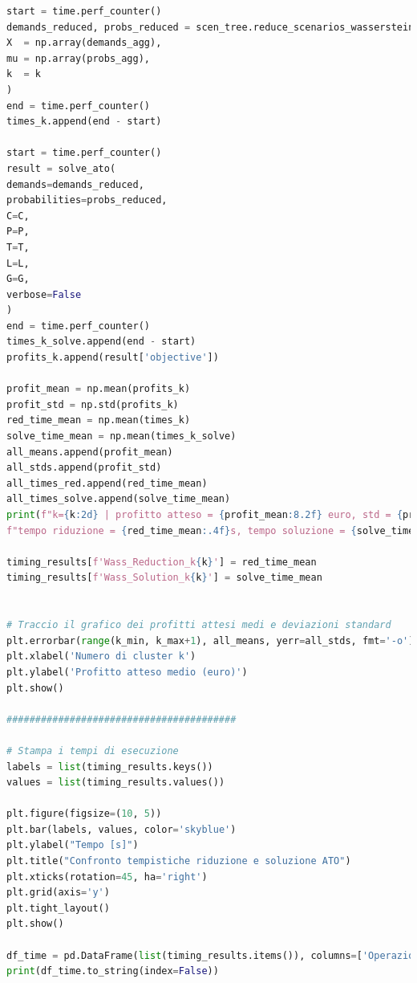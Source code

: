 \documentclass[a4paper,12pt]{article}
\begin{document}
\begin{lstlisting}[language=python,caption={Main of ATO problem},label={lst:main-ato}]
start = time.perf_counter()
demands_reduced, probs_reduced = scen_tree.reduce_scenarios_wasserstein_multiD(
X  = np.array(demands_agg),
mu = np.array(probs_agg),
k  = k
)
end = time.perf_counter()
times_k.append(end - start)

start = time.perf_counter()
result = solve_ato(
demands=demands_reduced,
probabilities=probs_reduced,
C=C,
P=P,
T=T,
L=L,
G=G,
verbose=False
)
end = time.perf_counter()
times_k_solve.append(end - start)
profits_k.append(result['objective'])

profit_mean = np.mean(profits_k)
profit_std = np.std(profits_k)    
red_time_mean = np.mean(times_k)
solve_time_mean = np.mean(times_k_solve)
all_means.append(profit_mean)
all_stds.append(profit_std)
all_times_red.append(red_time_mean)
all_times_solve.append(solve_time_mean)
print(f"k={k:2d} | profitto atteso = {profit_mean:8.2f} euro, std = {profit_std:6.2f} euro, "
f"tempo riduzione = {red_time_mean:.4f}s, tempo soluzione = {solve_time_mean:.4f}s")

timing_results[f'Wass_Reduction_k{k}'] = red_time_mean
timing_results[f'Wass_Solution_k{k}'] = solve_time_mean


# Traccio il grafico dei profitti attesi medi e deviazioni standard
plt.errorbar(range(k_min, k_max+1), all_means, yerr=all_stds, fmt='-o')
plt.xlabel('Numero di cluster k')
plt.ylabel('Profitto atteso medio (euro)')
plt.show()

########################################

# Stampa i tempi di esecuzione
labels = list(timing_results.keys())
values = list(timing_results.values())

plt.figure(figsize=(10, 5))
plt.bar(labels, values, color='skyblue')
plt.ylabel("Tempo [s]")
plt.title("Confronto tempistiche riduzione e soluzione ATO")
plt.xticks(rotation=45, ha='right')
plt.grid(axis='y')
plt.tight_layout()
plt.show()

df_time = pd.DataFrame(list(timing_results.items()), columns=['Operazione', 'Tempo [s]'])
print(df_time.to_string(index=False))


\end{lstlisting}
\end{document}
